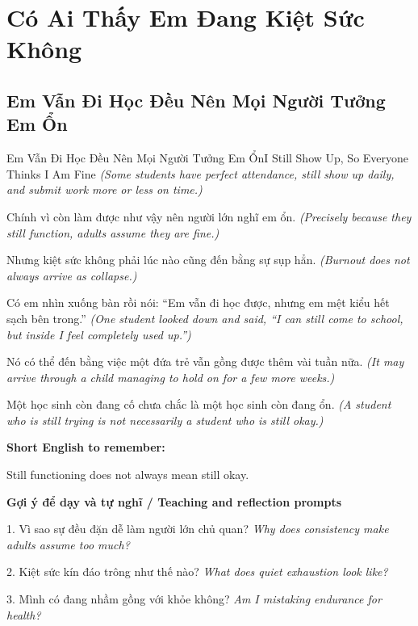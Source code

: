 \chapter{Có Ai Thấy Em Đang Kiệt Sức Không}

\section{Em Vẫn Đi Học Đều Nên Mọi Người Tưởng Em Ổn}
\begin{truyen}{Em Vẫn Đi Học Đều Nên Mọi Người Tưởng Em Ổn}{I Still Show Up, So Everyone Thinks I Am Fine}
\textit{(Some students have perfect attendance, still show up daily, and submit work more or less on time.)}

Chính vì còn làm được như vậy nên người lớn nghĩ em ổn.
\textit{(Precisely because they still function, adults assume they are fine.)}

Nhưng kiệt sức không phải lúc nào cũng đến bằng sự sụp hẳn.
\textit{(Burnout does not always arrive as collapse.)}

Có em nhìn xuống bàn rồi nói: “Em vẫn đi học được, nhưng em mệt kiểu hết sạch bên trong.”
\textit{(One student looked down and said, “I can still come to school, but inside I feel completely used up.”)}

Nó có thể đến bằng việc một đứa trẻ vẫn gồng được thêm vài tuần nữa.
\textit{(It may arrive through a child managing to hold on for a few more weeks.)}

\end{truyen}

\begin{baihoc}
Một học sinh còn đang cố chưa chắc là một học sinh còn đang ổn.
\textit{(A student who is still trying is not necessarily a student who is still okay.)}
\end{baihoc}

\begin{ghinhoanh}
\textbf{Short English to remember:}

Still functioning does not always mean still okay.

\end{ghinhoanh}

\begin{tuhocnhanh}
\textbf{Gợi ý để dạy và tự nghĩ / Teaching and reflection prompts}

1. Vì sao sự đều đặn dễ làm người lớn chủ quan? \textit{Why does consistency make adults assume too much?}

2. Kiệt sức kín đáo trông như thế nào? \textit{What does quiet exhaustion look like?}

3. Mình có đang nhầm gồng với khỏe không? \textit{Am I mistaking endurance for health?}
\end{tuhocnhanh}
\ngancach

